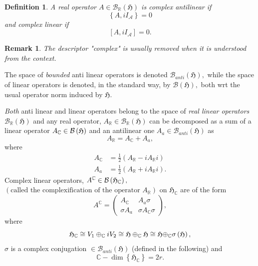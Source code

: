 \documentclass[aps,preprint]{revtex4}
\newtheorem{definition}[theorem]{Definition}
\newtheorem{remark}[theorem]{Remark}
\begin{document}
\begin{definition}
A real operator $A\in \mathcal{B}_{\mathbb{R}}\left( \mathfrak{H}\right) $
is \emph{complex} \emph{antilinear} if 
\begin{equation}
\left\{ A,iI_{\mathcal{A}}\right\} =0
\end{equation}%
and \emph{complex} \emph{linear} if 
\begin{equation}
\left[ A,iI_{\mathcal{A}}\right] =0.
\end{equation}
\end{definition}

\begin{remark}
The descriptor "complex" is usually removed when it is understood from the
context.
\end{remark}

The space of \emph{bounded} anti linear operators is denoted $\mathcal{B}%
_{anti}\left( \mathfrak{H}\right) ,$ while the space of linear operators is
denoted, in the standard way, by $\mathcal{B}\left( \mathfrak{H}\right) ,$
both wrt the usual operator norm induced by $\mathfrak{H}.$

\emph{Both} anti linear and linear operators belong to the space of \emph{%
real linear operators} $\mathcal{B}_{\mathbb{R}}\left( \mathfrak{H}\right) $
and any real operator, $A_{\mathbb{R}}\in \mathcal{B}_{\mathbb{R}}\left( 
\mathfrak{H}\right) $ can be decomposed as a sum of a linear operator $A_{%
\mathbb{C}}\in \mathcal{B}\left( \mathfrak{H}\right) $ and an antilinear one 
$A_{a}\in \mathcal{B}_{anti}\left( \mathfrak{H}\right) $ as 
\begin{equation}
A_{\mathbb{R}}=A_{\mathbb{C}}+A_{a},
\end{equation}%
where 
\begin{align}
A_{\mathbb{C}}& =\frac{1}{2}\left( A_{\mathbb{R}}-iA_{\mathbb{R}}i\right) \\
A_{a}& =\frac{1}{2}\left( A_{\mathbb{R}}+iA_{\mathbb{R}}i\right) .
\end{align}%
Complex linear operators, $A^{\mathbb{C}}\in \mathcal{B}\left( \mathfrak{H}_{%
\mathbb{C}}\right) ,$ $\left( \text{called the complexification of the
operator }A_{\mathbb{R}}\right) $ on $\mathfrak{H}_{\mathbb{C}}$ are of the
form 
\begin{equation}
A^{\mathbb{C}}=\left( 
\begin{array}{cc}
A_{\mathbb{C}} & A_{a}\sigma \\ 
\sigma A_{a} & \sigma A_{\mathbb{C}}\sigma%
\end{array}%
\right) ,
\end{equation}%
where 
\begin{equation}
\mathfrak{H}_{\mathbb{C}}\cong V_{1}\oplus _{\mathbb{C}}iV_{2}\cong 
\mathfrak{H}\oplus _{\mathbb{C}}\mathfrak{H\cong \mathfrak{H}\oplus _{%
\mathbb{C}}}\sigma \left( \mathfrak{\mathfrak{H}}\right) \mathfrak{,}
\end{equation}%
$\sigma $ is a complex conjugation $\in \mathcal{B}_{anti}\left( \mathfrak{H}%
\right) $ (defined in the following) and 
\begin{equation}
\mathbb{C}-\dim \left\{ \mathfrak{H}_{\mathbb{C}}\right\} =2r.
\end{equation}
\end{document}
